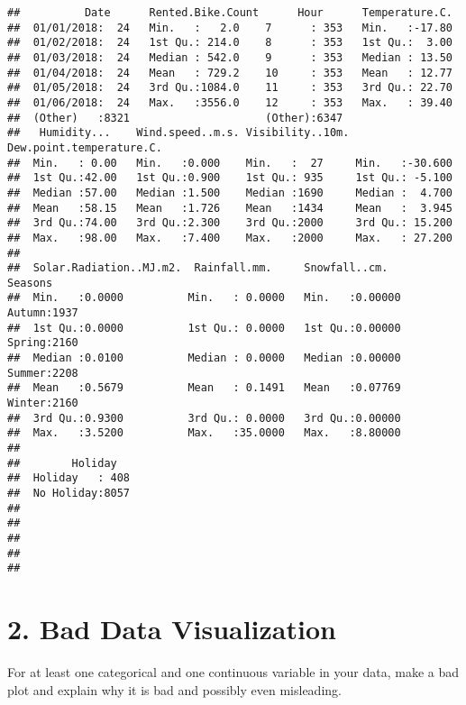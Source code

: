 \documentclass[
]{article}
\begin{document}
\begin{verbatim}
##          Date      Rented.Bike.Count      Hour      Temperature.C.  
##  01/01/2018:  24   Min.   :   2.0    7      : 353   Min.   :-17.80  
##  01/02/2018:  24   1st Qu.: 214.0    8      : 353   1st Qu.:  3.00  
##  01/03/2018:  24   Median : 542.0    9      : 353   Median : 13.50  
##  01/04/2018:  24   Mean   : 729.2    10     : 353   Mean   : 12.77  
##  01/05/2018:  24   3rd Qu.:1084.0    11     : 353   3rd Qu.: 22.70  
##  01/06/2018:  24   Max.   :3556.0    12     : 353   Max.   : 39.40  
##  (Other)   :8321                     (Other):6347                   
##   Humidity...    Wind.speed..m.s. Visibility..10m. Dew.point.temperature.C.
##  Min.   : 0.00   Min.   :0.000    Min.   :  27     Min.   :-30.600         
##  1st Qu.:42.00   1st Qu.:0.900    1st Qu.: 935     1st Qu.: -5.100         
##  Median :57.00   Median :1.500    Median :1690     Median :  4.700         
##  Mean   :58.15   Mean   :1.726    Mean   :1434     Mean   :  3.945         
##  3rd Qu.:74.00   3rd Qu.:2.300    3rd Qu.:2000     3rd Qu.: 15.200         
##  Max.   :98.00   Max.   :7.400    Max.   :2000     Max.   : 27.200         
##                                                                            
##  Solar.Radiation..MJ.m2.  Rainfall.mm.     Snowfall..cm.       Seasons    
##  Min.   :0.0000          Min.   : 0.0000   Min.   :0.00000   Autumn:1937  
##  1st Qu.:0.0000          1st Qu.: 0.0000   1st Qu.:0.00000   Spring:2160  
##  Median :0.0100          Median : 0.0000   Median :0.00000   Summer:2208  
##  Mean   :0.5679          Mean   : 0.1491   Mean   :0.07769   Winter:2160  
##  3rd Qu.:0.9300          3rd Qu.: 0.0000   3rd Qu.:0.00000                
##  Max.   :3.5200          Max.   :35.0000   Max.   :8.80000                
##                                                                           
##        Holiday    
##  Holiday   : 408  
##  No Holiday:8057  
##                   
##                   
##                   
##                   
## 
\end{verbatim}

\hypertarget{bad-data-visualization}{%
\section{2. Bad Data Visualization}\label{bad-data-visualization}}

For at least one categorical and one continuous variable in your data,
make a bad plot and explain why it is bad and possibly even misleading.
\end{document}
